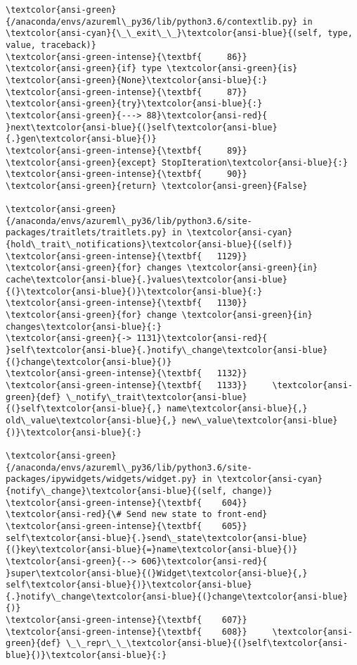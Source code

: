 \documentclass[11pt]{article}
\begin{document}
\begin{Verbatim}[commandchars=\\\{\}, frame=single, framerule=2mm, rulecolor=\color{outerrorbackground}]
\textcolor{ansi-green}{/anaconda/envs/azureml\_py36/lib/python3.6/contextlib.py} in \textcolor{ansi-cyan}{\_\_exit\_\_}\textcolor{ansi-blue}{(self, type, value, traceback)}
\textcolor{ansi-green-intense}{\textbf{     86}}         \textcolor{ansi-green}{if} type \textcolor{ansi-green}{is} \textcolor{ansi-green}{None}\textcolor{ansi-blue}{:}
\textcolor{ansi-green-intense}{\textbf{     87}}             \textcolor{ansi-green}{try}\textcolor{ansi-blue}{:}
\textcolor{ansi-green}{---> 88}\textcolor{ansi-red}{                 }next\textcolor{ansi-blue}{(}self\textcolor{ansi-blue}{.}gen\textcolor{ansi-blue}{)}
\textcolor{ansi-green-intense}{\textbf{     89}}             \textcolor{ansi-green}{except} StopIteration\textcolor{ansi-blue}{:}
\textcolor{ansi-green-intense}{\textbf{     90}}                 \textcolor{ansi-green}{return} \textcolor{ansi-green}{False}

\textcolor{ansi-green}{/anaconda/envs/azureml\_py36/lib/python3.6/site-packages/traitlets/traitlets.py} in \textcolor{ansi-cyan}{hold\_trait\_notifications}\textcolor{ansi-blue}{(self)}
\textcolor{ansi-green-intense}{\textbf{   1129}}                 \textcolor{ansi-green}{for} changes \textcolor{ansi-green}{in} cache\textcolor{ansi-blue}{.}values\textcolor{ansi-blue}{(}\textcolor{ansi-blue}{)}\textcolor{ansi-blue}{:}
\textcolor{ansi-green-intense}{\textbf{   1130}}                     \textcolor{ansi-green}{for} change \textcolor{ansi-green}{in} changes\textcolor{ansi-blue}{:}
\textcolor{ansi-green}{-> 1131}\textcolor{ansi-red}{                         }self\textcolor{ansi-blue}{.}notify\_change\textcolor{ansi-blue}{(}change\textcolor{ansi-blue}{)}
\textcolor{ansi-green-intense}{\textbf{   1132}} 
\textcolor{ansi-green-intense}{\textbf{   1133}}     \textcolor{ansi-green}{def} \_notify\_trait\textcolor{ansi-blue}{(}self\textcolor{ansi-blue}{,} name\textcolor{ansi-blue}{,} old\_value\textcolor{ansi-blue}{,} new\_value\textcolor{ansi-blue}{)}\textcolor{ansi-blue}{:}

\textcolor{ansi-green}{/anaconda/envs/azureml\_py36/lib/python3.6/site-packages/ipywidgets/widgets/widget.py} in \textcolor{ansi-cyan}{notify\_change}\textcolor{ansi-blue}{(self, change)}
\textcolor{ansi-green-intense}{\textbf{    604}}                 \textcolor{ansi-red}{\# Send new state to front-end}
\textcolor{ansi-green-intense}{\textbf{    605}}                 self\textcolor{ansi-blue}{.}send\_state\textcolor{ansi-blue}{(}key\textcolor{ansi-blue}{=}name\textcolor{ansi-blue}{)}
\textcolor{ansi-green}{--> 606}\textcolor{ansi-red}{         }super\textcolor{ansi-blue}{(}Widget\textcolor{ansi-blue}{,} self\textcolor{ansi-blue}{)}\textcolor{ansi-blue}{.}notify\_change\textcolor{ansi-blue}{(}change\textcolor{ansi-blue}{)}
\textcolor{ansi-green-intense}{\textbf{    607}} 
\textcolor{ansi-green-intense}{\textbf{    608}}     \textcolor{ansi-green}{def} \_\_repr\_\_\textcolor{ansi-blue}{(}self\textcolor{ansi-blue}{)}\textcolor{ansi-blue}{:}


\end{Verbatim}
\end{document}
